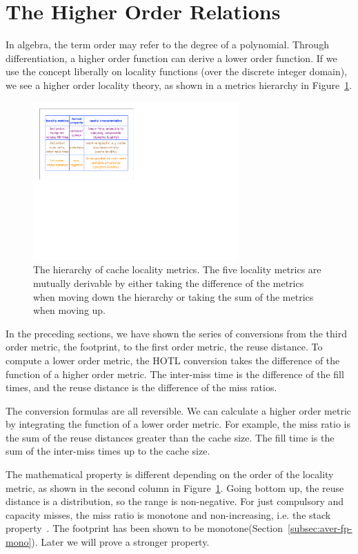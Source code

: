 \section{The Higher Order Relations}
\label{sec:relations}

In algebra, the term order may refer to the degree of a polynomial.
Through differentiation, a higher order function can derive a lower
order function.  If we use the concept liberally on locality functions
(over the discrete integer domain), we see a higher order locality
theory, as shown in a metrics hierarchy in Figure~\ref{fig:theory}.

\begin{figure}[h!]
\centering
\includegraphics[width=0.7\textwidth]{figures/model/theory}
\caption{The hierarchy of cache locality metrics.  The five locality metrics are
  mutually derivable by either taking the difference of the metrics
  when moving down the hierarchy or taking the sum of the metrics 
  when moving up.}
\label{fig:theory}
\end{figure}

In the preceding sections, we have shown the series of conversions
from the third order metric, the footprint, to the first order metric,
the reuse distance.  To compute a lower order metric, the HOTL
conversion takes the difference of the function of a higher order
metric.  The inter-miss time is the difference of the fill times, and
the reuse distance is the difference of the miss ratios. 

The conversion formulas are all reversible.  We can calculate a higher
order metric by integrating the function of a lower order metric. For
example, the miss ratio is the sum of the reuse distances greater than
the cache size.  The fill time is the sum of the inter-miss times up
to the cache size.

The mathematical property is different depending on the order of the
locality metric, as shown in the second column in
Figure~\ref{fig:theory}.  Going bottom up, the reuse distance is a
distribution, so the range is non-negative.  For just compulsory and
capacity misses, the miss ratio is monotone and non-increasing,
i.e. the stack property~\cite{Mattson+:IBM70}.  The footprint has been
shown to be monotone(Section~\ref{subsec:aver-fp-mono}).  Later we will prove
a stronger property. 

